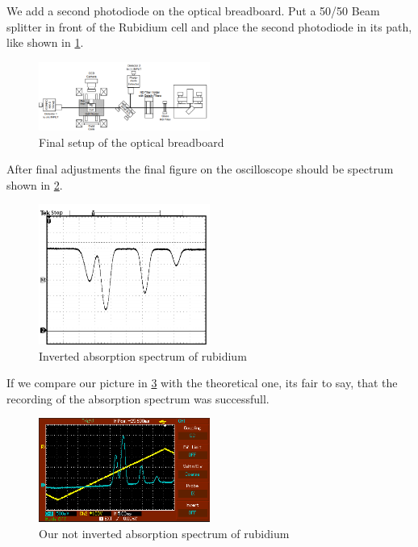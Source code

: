 We add a second photodiode on the optical breadboard.
Put a 50/50 Beam splitter in front of the Rubidium cell and place the second photodiode in its path, like shown in \ref{fig:part3}.
\begin{figure}
    \centering
    \includegraphics[width=0.5\textwidth]{images/part3.png}
    \caption{Final setup of the optical breadboard \cite{V60}}
    \label{fig:part3}
\end{figure}
After final adjustments the final figure on the oscilloscope should be spectrum shown in \ref{fig:osci4}.
\begin{figure}
    \centering
    \includegraphics[width=0.5\textwidth]{images/oszi2.png}
    \caption{Inverted absorption spectrum of rubidium \cite{V60}}
    \label{fig:osci4}
\end{figure}
If we compare our picture in \ref{fig:spektrum} with the theoretical one, its fair to say, that the recording of the absorption spectrum was successfull.
\begin{figure}
    \centering
    \includegraphics[width=0.5\textwidth]{images/spektrum.png}
    \caption{Our not inverted absorption spectrum of rubidium}
    \label{fig:spektrum}
\end{figure}